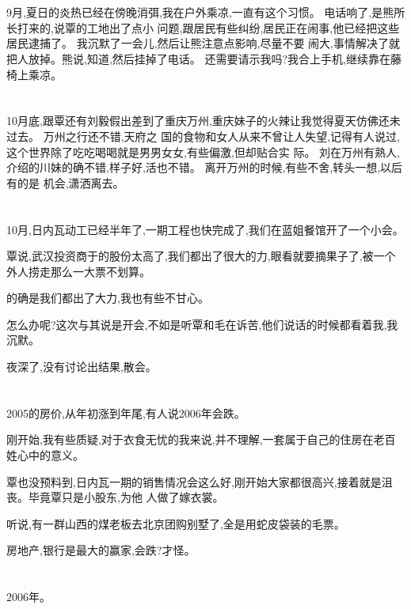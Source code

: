 \documentclass[11pt]{article}
\begin{document}
\section{}
9月,夏日的炎热已经在傍晚消弭,我在户外乘凉,一直有这个习惯。 电话响了,是熊所长打来的,说覃的工地出了点小
问题,跟居民有些纠纷,居民正在闹事,他已经把这些居民逮捕了。 我沉默了一会儿,然后让熊注意点影响,尽量不要
闹大,事情解决了就把人放掉。熊说,知道,然后挂掉了电话。 还需要请示我吗?我合上手机,继续靠在藤椅上乘凉。

\section{}
10月底,跟覃还有刘毅假出差到了重庆万州,重庆妹子的火辣让我觉得夏天仿佛还未过去。 万州之行还不错,天府之
国的食物和女人从来不曾让人失望,记得有人说过,这个世界除了吃吃喝喝就是男男女女,有些偏激,但却贴合实
际。 刘在万州有熟人,介绍的川妹的确不错,样子好,活也不错。 离开万州的时候,有些不舍,转头一想,以后有的是
机会,潇洒离去。

\section{}
10月,日内瓦动工已经半年了,一期工程也快完成了,我们在蓝姐餐馆开了一个小会。

覃说,武汉投资商于的股份太高了,我们都出了很大的力,眼看就要摘果子了,被一个外人捞走那么一大票不划算。

的确是我们都出了大力,我也有些不甘心。

怎么办呢?这次与其说是开会,不如是听覃和毛在诉苦,他们说话的时候都看着我,我沉默。

夜深了,没有讨论出结果,散会。

\section{}
2005的房价,从年初涨到年尾,有人说2006年会跌。

刚开始,我有些质疑,对于衣食无忧的我来说,并不理解,一套属于自己的住房在老百姓心中的意义。

覃也没预料到,日内瓦一期的销售情况会这么好,刚开始大家都很高兴,接着就是沮丧。毕竟覃只是小股东,为他
人做了嫁衣裳。

听说,有一群山西的煤老板去北京团购别墅了,全是用蛇皮袋装的毛票。

房地产,银行是最大的赢家,会跌?才怪。

\section{}
2006年。
\end{document}
